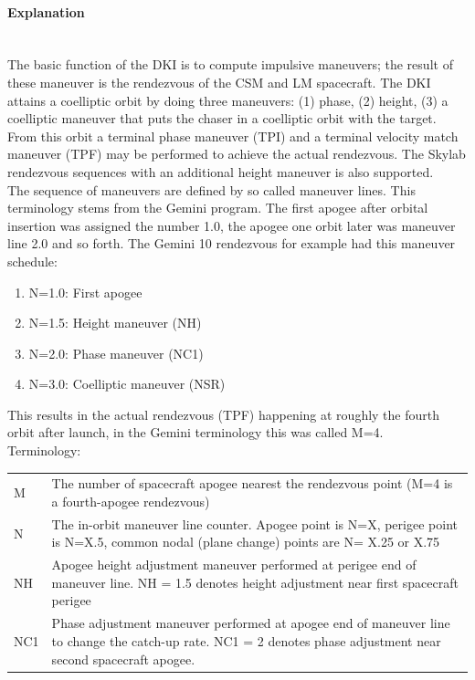\documentclass[11pt]{article} %
\begin{document}
\paragraph{Explanation}\mbox{} \\

The basic function of the DKI is to compute impulsive maneuvers; the result of these maneuver is the rendezvous of the CSM and LM spacecraft. The DKI attains a coelliptic orbit by doing three maneuvers: (1) phase, (2) height, (3) a coelliptic maneuver that puts the chaser in a coelliptic orbit with the target. From this orbit a terminal phase maneuver (TPI) and a terminal velocity match maneuver (TPF) may be performed to achieve the actual rendezvous. The Skylab rendezvous sequences with an additional height maneuver is also supported.\\

The sequence of maneuvers are defined by so called maneuver lines. This terminology stems from the Gemini program. The first apogee after orbital insertion was assigned the number 1.0, the apogee one orbit later was maneuver line 2.0 and so forth. The Gemini 10 rendezvous for example had this maneuver schedule:

\begin{enumerate}
\item N=1.0: First apogee
\item N=1.5: Height maneuver (NH)
\item N=2.0: Phase maneuver (NC1)
\item N=3.0: Coelliptic maneuver (NSR)
\end{enumerate}

This results in the actual rendezvous (TPF) happening at roughly the fourth orbit after launch, in the Gemini terminology this was called M=4.\\

Terminology:\\

\begin{center}
\begin{tabular}{ p{1cm} p{10cm} }
M&The number of spacecraft apogee nearest the rendezvous point (M=4 is a fourth-apogee rendezvous)\\
N&The in-orbit maneuver line counter. Apogee point is N=X, perigee point is N=X.5, common nodal (plane change) points are N= X.25 or X.75\\
NH&Apogee height adjustment maneuver performed at perigee end of maneuver line. NH = 1.5 denotes height adjustment near first spacecraft perigee\\
NC1&Phase adjustment maneuver performed at apogee end of maneuver line to change the catch-up rate. NC1 = 2 denotes phase adjustment near second spacecraft apogee.\\
\end{tabular}
\end{center}
\end{document}
